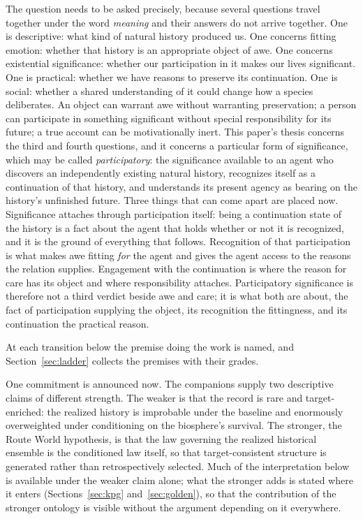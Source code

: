 The question needs to be asked precisely, because several questions travel
together under the word \emph{meaning} and their answers do not arrive
together. One is descriptive: what kind of natural history produced us. One
concerns fitting emotion: whether that history is an appropriate object of
awe. One concerns existential significance: whether our participation in it
makes our lives significant. One is practical: whether we have reasons to
preserve its continuation. One is social: whether a shared understanding of it
could change how a species deliberates. An object can warrant awe without
warranting preservation; a person can participate in something significant
without special responsibility for its future; a true account can be
motivationally inert. This paper's thesis concerns the third and fourth
questions, and it concerns a particular form of significance, which may be
called \emph{participatory}: the significance available to an agent who
discovers an independently existing natural history, recognizes itself as a
continuation of that history, and understands its present agency as bearing on
the history's unfinished future. Three things that can come apart are placed
now. Significance attaches through participation itself: being a
continuation state of the history is a fact about the agent that holds
whether or not it is recognized, and it is the ground of everything that
follows. Recognition of that participation is what makes awe fitting
\emph{for} the agent and gives the agent access to the reasons the relation
supplies. Engagement with the continuation is where the reason for care has
its object and where responsibility attaches. Participatory significance is
therefore not a third verdict beside awe and care; it is what both are about,
the fact of participation supplying the object, its recognition the
fittingness, and its continuation the practical reason.

At each transition below the premise doing the work is named, and
Section~\ref{sec:ladder} collects the premises with their grades.

One commitment is announced now. The companions supply two descriptive claims of different
strength. The weaker is that the record is rare and target-enriched: the
realized history is improbable under the baseline and enormously overweighted
under conditioning on the biosphere's survival. The stronger, the Route World
hypothesis, is that the law governing the realized historical ensemble is the
conditioned law itself, so that target-consistent structure is generated
rather than retrospectively selected. Much of the interpretation below is
available under the weaker claim alone; what the stronger adds is stated where
it enters (Sections~\ref{sec:kpg} and~\ref{sec:golden}), so that the
contribution of the stronger ontology is visible without the argument
depending on it everywhere.

